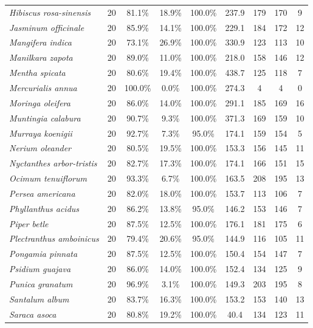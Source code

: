 \begin{table}[htbp]
\begin{tabular}{@{}l c c c c c c c c@{}}
\textit{Hibiscus rosa-sinensis} & 20 & 81.1\% & 18.9\% & 100.0\% & 237.9 & 179 & 170 & 9 \\
\textit{Jasminum officinale} & 20 & 85.9\% & 14.1\% & 100.0\% & 229.1 & 184 & 172 & 12 \\
\textit{Mangifera indica} & 20 & 73.1\% & 26.9\% & 100.0\% & 330.9 & 123 & 113 & 10 \\
\textit{Manilkara zapota} & 20 & 89.0\% & 11.0\% & 100.0\% & 218.0 & 158 & 146 & 12 \\
\textit{Mentha spicata} & 20 & 80.6\% & 19.4\% & 100.0\% & 438.7 & 125 & 118 & 7 \\
\textit{Mercurialis annua} & 20 & 100.0\% & 0.0\% & 100.0\% & 274.3 & 4 & 4 & 0 \\
\textit{Moringa oleifera} & 20 & 86.0\% & 14.0\% & 100.0\% & 291.1 & 185 & 169 & 16 \\
\textit{Muntingia calabura} & 20 & 90.7\% & 9.3\% & 100.0\% & 371.3 & 169 & 159 & 10 \\
\textit{Murraya koenigii} & 20 & 92.7\% & 7.3\% & 95.0\% & 174.1 & 159 & 154 & 5 \\
\textit{Nerium oleander} & 20 & 80.5\% & 19.5\% & 100.0\% & 153.3 & 156 & 145 & 11 \\
\textit{Nyctanthes arbor-tristis} & 20 & 82.7\% & 17.3\% & 100.0\% & 174.1 & 166 & 151 & 15 \\
\textit{Ocimum tenuiflorum} & 20 & 93.3\% & 6.7\% & 100.0\% & 163.5 & 208 & 195 & 13 \\
\textit{Persea americana} & 20 & 82.0\% & 18.0\% & 100.0\% & 153.7 & 113 & 106 & 7 \\
\textit{Phyllanthus acidus} & 20 & 86.2\% & 13.8\% & 95.0\% & 146.2 & 153 & 146 & 7 \\
\textit{Piper betle} & 20 & 87.5\% & 12.5\% & 100.0\% & 176.1 & 181 & 175 & 6 \\
\textit{Plectranthus amboinicus} & 20 & 79.4\% & 20.6\% & 95.0\% & 144.9 & 116 & 105 & 11 \\
\textit{Pongamia pinnata} & 20 & 87.5\% & 12.5\% & 100.0\% & 150.4 & 154 & 147 & 7 \\
\textit{Psidium guajava} & 20 & 86.0\% & 14.0\% & 100.0\% & 152.4 & 134 & 125 & 9 \\
\textit{Punica granatum} & 20 & 96.9\% & 3.1\% & 100.0\% & 149.3 & 203 & 195 & 8 \\
\textit{Santalum album} & 20 & 83.7\% & 16.3\% & 100.0\% & 153.2 & 153 & 140 & 13 \\
\textit{Saraca asoca} & 20 & 80.8\% & 19.2\% & 100.0\% & 40.4 & 134 & 123 & 11 \\

\end{tabular}
\end{table}
